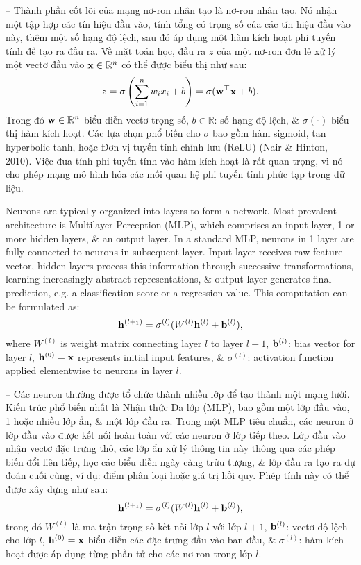 \documentclass{article}
\begin{document}
\begin{itemize}
\begin{itemize}
        -- Thành phần cốt lõi của mạng nơ-ron nhân tạo là nơ-ron nhân tạo. Nó nhận một tập hợp các tín hiệu đầu vào, tính tổng có trọng số của các tín hiệu đầu vào này, thêm một số hạng độ lệch, sau đó áp dụng một hàm kích hoạt phi tuyến tính để tạo ra đầu ra. Về mặt toán học, đầu ra $z$ của một nơ-ron đơn lẻ xử lý một vectơ đầu vào ${\bf x}\in\mathbb{R}^n$ có thể được biểu thị như sau:
        \begin{equation*}
            z = \sigma\left(\sum_{i=1}^n w_ix_i + b\right) = \sigma({\bf w}^\top{\bf x} + b).
        \end{equation*}
        Trong đó ${\bf w}\in\mathbb{R}^n$ biểu diễn vectơ trọng số, $b\in\mathbb{R}$: số hạng độ lệch, \& $\sigma(\cdot)$ biểu thị hàm kích hoạt. Các lựa chọn phổ biến cho $\sigma$ bao gồm hàm sigmoid, tan hyperbolic tanh, hoặc Đơn vị tuyến tính chỉnh lưu (ReLU) (Nair \& Hinton, 2010). Việc đưa tính phi tuyến tính vào hàm kích hoạt là rất quan trọng, vì nó cho phép mạng mô hình hóa các mối quan hệ phi tuyến tính phức tạp trong dữ liệu.

        Neurons are typically organized into layers to form a network. Most prevalent architecture is Multilayer Perception (MLP), which comprises an input layer, 1 or more hidden layers, \& an output layer. In a standard MLP, neurons in 1 layer are fully connected to neurons in subsequent layer. Input layer receives raw feature vector, hidden layers process this information through successive transformations, learning increasingly abstract representations, \& output layer generates final prediction, e.g. a classification score or a regression value. This computation can be formulated as:
        \begin{equation*}
            {\bf h}^{(l +_1)} = \sigma^{(l)}(W^{(l)}{\bf h}^{(l)} + {\bf b}^{(l)}),
        \end{equation*}
        where $W^{(l)}$ is weight matrix connecting layer $l$ to layer $l + 1$, ${\bf b}^{(l)}$: bias vector for layer $l$, ${\bf h}^{(0)} = {\bf x}$ represents initial input features, \& $\sigma^{(l)}$: activation function applied elementwise to neurons in layer $l$.

        -- Các neuron thường được tổ chức thành nhiều lớp để tạo thành một mạng lưới. Kiến trúc phổ biến nhất là Nhận thức Đa lớp (MLP), bao gồm một lớp đầu vào, 1 hoặc nhiều lớp ẩn, \& một lớp đầu ra. Trong một MLP tiêu chuẩn, các neuron ở lớp đầu vào được kết nối hoàn toàn với các neuron ở lớp tiếp theo. Lớp đầu vào nhận vectơ đặc trưng thô, các lớp ẩn xử lý thông tin này thông qua các phép biến đổi liên tiếp, học các biểu diễn ngày càng trừu tượng, \& lớp đầu ra tạo ra dự đoán cuối cùng, ví dụ: điểm phân loại hoặc giá trị hồi quy. Phép tính này có thể được xây dựng như sau:
        \begin{equation*}
            {\bf h}^{(l +_1)} = \sigma^{(l)}(W^{(l)}{\bf h}^{(l)} + {\bf b}^{(l)}),
        \end{equation*}
        trong đó $W^{(l)}$ là ma trận trọng số kết nối lớp $l$ với lớp $l + 1$, ${\bf b}^{(l)}$: vectơ độ lệch cho lớp $l$, ${\bf h}^{(0)} = {\bf x}$ biểu diễn các đặc trưng đầu vào ban đầu, \& $\sigma^{(l)}$: hàm kích hoạt được áp dụng từng phần tử cho các nơ-ron trong lớp $l$.


\end{itemize}
\end{itemize}
\end{document}
